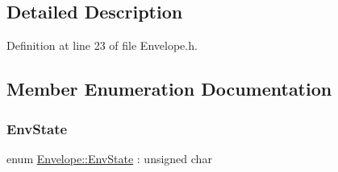 \subsection{Detailed Description}


Definition at line 23 of file Envelope.\+h.



\subsection{Member Enumeration Documentation}
\mbox{\label{class_envelope_a16c15d3d555a1a27869f48696f430d5f}} 
\subsubsection{\texorpdfstring{Env\+State}{EnvState}}
{\footnotesize\ttfamily enum \hyperlink{class_envelope_a16c15d3d555a1a27869f48696f430d5f}{Envelope\+::\+Env\+State} \+: unsigned char}

